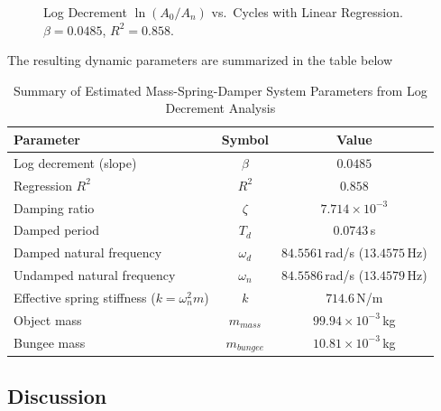 \documentclass{article}
\begin{document}
\begin{figure}[H]
    \centering
    \caption{Log Decrement $\ln(A_0/A_n)$ vs.\ Cycles with Linear Regression. $\beta = 0.0485$, $R^2 = 0.858$.}
    \label{fig:logdec}
\end{figure}

\noindent The resulting dynamic parameters are summarized in the table below

\begin{table}[H]
    \centering
    \caption{Summary of Estimated Mass-Spring-Damper System Parameters from Log Decrement Analysis}
    \label{tab:dynamic_params}
    \begin{tabular}{lcc}
        \toprule
        \textbf{Parameter} & \textbf{Symbol} & \textbf{Value} \\
        \midrule
        Log decrement (slope)                       & $\beta$              & $0.0485$ \\
        Regression $R^2$                            & $R^2$                  & $0.858$ \\
        Damping ratio                               & $\zeta$              & $7.714 \times 10^{-3}$ \\
        Damped period                               & $T_d$                & $0.0743$\,s \\
        Damped natural frequency                    & $\omega_d$           & $84.5561$\,rad/s ($13.4575$\,Hz) \\
        Undamped natural frequency                  & $\omega_n$ & $84.5586$\,rad/s ($13.4579$\,Hz) \\
        Effective spring stiffness ($k = \omega_n^2 m$) & $k$             & $714.6$\,N/m \\
        Object mass                                        & $m_{mass}$                  & $99.94 \times 10^{-3}$\,kg \\
        Bungee mass                                        & $m_{bungee}$                  & $10.81 \times 10^{-3}$\,kg \\
        \bottomrule
    \end{tabular}
\end{table}

\subsection{Discussion}
\end{document}

